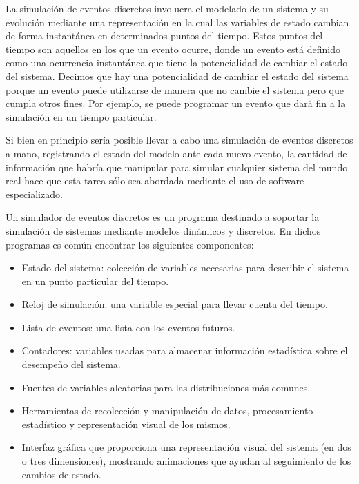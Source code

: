 La simulación de eventos discretos involucra el modelado de un sistema y su
evolución mediante una representación en la cual las variables de estado
cambian de forma instantánea en determinados puntos del tiempo. Estos puntos
del tiempo son aquellos en los que un evento ocurre, donde un evento está
definido como una ocurrencia instantánea que tiene la potencialidad de cambiar
el estado del sistema. Decimos que hay una potencialidad de cambiar el estado
del sistema porque un evento puede utilizarse de manera que no cambie el
sistema pero que cumpla otros fines. Por ejemplo, se puede programar un evento
que dará fin a la simulación en un tiempo particular.

Si bien en principio sería posible llevar a cabo una simulación de eventos
discretos a mano, registrando el estado del modelo ante cada nuevo evento, la
cantidad de información que habría que manipular para simular cualquier sistema
del mundo real hace que esta tarea sólo sea abordada mediante el uso de
software especializado.

Un simulador de eventos discretos es un programa destinado a soportar la
simulación de sistemas mediante modelos dinámicos y discretos. En dichos
programas es común encontrar los siguientes componentes:

\begin{itemize}
    \item Estado del sistema: colección de variables necesarias para describir
    el sistema en un punto particular del tiempo.

    \item Reloj de simulación: una variable especial para llevar cuenta del
    tiempo.

    \item Lista de eventos: una lista con los eventos futuros.

    \item Contadores: variables usadas para almacenar información estadística
    sobre el desempeño del sistema.

    \item Fuentes de variables aleatorias para las distribuciones más comunes.

    \item Herramientas de recolección y manipulación de datos, procesamiento
    estadístico y representación visual de los mismos.

    \item Interfaz gráfica que proporciona una representación visual del
    sistema (en dos o tres dimensiones), mostrando animaciones que ayudan al
    seguimiento de los cambios de estado.
\end{itemize}

